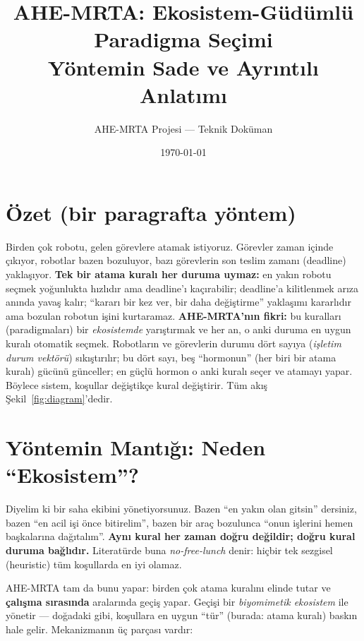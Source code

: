 \documentclass[11pt,a4paper]{article}
\title{\textbf{AHE-MRTA: Ekosistem-Güdümlü Paradigma Seçimi}\\[3pt]
\large Yöntemin Sade ve Ayrıntılı Anlatımı}
\author{AHE-MRTA Projesi --- Teknik Doküman}
\date{\today}
\begin{document}
\maketitle

\section*{Özet (bir paragrafta yöntem)}
Birden çok robotu, gelen görevlere atamak istiyoruz. Görevler zaman içinde
çıkıyor, robotlar bazen bozuluyor, bazı görevlerin son teslim zamanı
(deadline) yaklaşıyor. \textbf{Tek bir atama kuralı her duruma uymaz:} en
yakın robotu seçmek yoğunlukta hızlıdır ama deadline'ı kaçırabilir; deadline'a
kilitlenmek arıza anında yavaş kalır; ``kararı bir kez ver, bir daha
değiştirme'' yaklaşımı kararlıdır ama bozulan robotun işini kurtaramaz.
\textbf{AHE-MRTA'nın fikri:} bu kuralları (paradigmaları) bir
\emph{ekosistemde} yarıştırmak ve her an, o anki duruma en uygun kuralı
otomatik seçmek. Robotların ve görevlerin durumu dört sayıya
(\emph{işletim durum vektörü}) sıkıştırılır; bu dört sayı, beş ``hormonun'' (her
biri bir atama kuralı) gücünü günceller; en güçlü hormon o anki kuralı seçer
ve atamayı yapar. Böylece sistem, koşullar değiştikçe kural değiştirir.
Tüm akış Şekil~\ref{fig:diagram}'dedir.

\tableofcontents
\bigskip

\section{Yöntemin Mantığı: Neden ``Ekosistem''?}
\label{sec:overview}

Diyelim ki bir saha ekibini yönetiyorsunuz. Bazen ``en yakın olan gitsin''
dersiniz, bazen ``en acil işi önce bitirelim'', bazen bir araç bozulunca
``onun işlerini hemen başkalarına dağıtalım''. \textbf{Aynı kural her zaman
doğru değildir; doğru kural duruma bağlıdır.} Literatürde buna
\emph{no-free-lunch} denir: hiçbir tek sezgisel (heuristic) tüm koşullarda en
iyi olamaz.

AHE-MRTA tam da bunu yapar: birden çok atama kuralını elinde tutar ve
\textbf{çalışma sırasında} aralarında geçiş yapar. Geçişi bir
\emph{biyomimetik ekosistem} ile yönetir --- doğadaki gibi, koşullara en uygun
``tür'' (burada: atama kuralı) baskın hale gelir. Mekanizmanın üç parçası
vardır:
\end{document}
